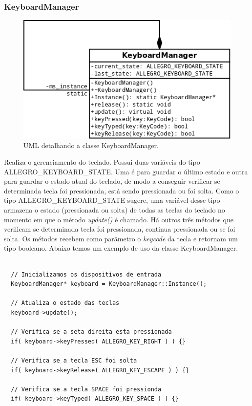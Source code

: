 \subsubsection{KeyboardManager}
%
%
%
\begin{figure}[h]
    \centering
    \includegraphics[scale = 0.6]{uml/KeyboardManager.png}
    \caption{UML detalhando a classe KeyboardManager.}
    \label{KeyboardManager}
\end{figure}
%
%
Realiza o gerenciamento do teclado. Possui duas variáveis do tipo ALLEGRO\_KEYBOARD\_STATE. Uma é para guardar o último estado e outra para guardar o estado atual do teclado, de modo a conseguir verificar se determinada tecla foi pressionada, está sendo pressionada ou foi solta. Como o tipo ALLEGRO\_KEYBOARD\_STATE sugere, uma variável desse tipo armazena o estado (pressionada ou solta) de todas as teclas do teclado no momento em que o método \textit{update()} é chamado. Há outros três métodos que verificam se determinada tecla foi pressionada, continua pressionada ou se foi solta. Os métodos recebem como parâmetro o \textit{keycode} da tecla e retornam um tipo booleano. Abaixo temos um exemplo de uso da classe KeyboardManager.
%
%
\begin{lstlisting}

  // Inicializamos os dispositivos de entrada
  KeyboardManager* keyboard = KeyboardManager::Instance();
  
  // Atualiza o estado das teclas
  keyboard->update();
	
  // Verifica se a seta direita esta pressionada
  if( keyboard->keyPressed( ALLEGRO_KEY_RIGHT ) ) {}
  
  // Verifica se a tecla ESC foi solta
  if( keyboard->keyRelease( ALLEGRO_KEY_ESCAPE ) ) {}
  
  // Verifica se a tecla SPACE foi pressionda
  if( keyboard->keyTyped( ALLEGRO_KEY_SPACE ) ) {}
	      
\end{lstlisting}
%
